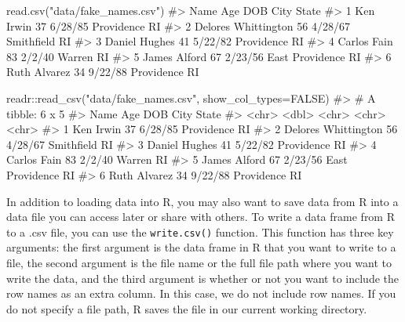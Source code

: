 \documentclass[
  letterpaper,
]{latex/krantz}
\makeatletter
\newenvironment{Shaded}{\begin{snugshade}}{\end{snugshade}}
\newcommand{\AttributeTok}[1]{\textcolor[rgb]{0.40,0.45,0.13}{#1}}
\newcommand{\CommentTok}[1]{\textcolor[rgb]{0.37,0.37,0.37}{#1}}
\newcommand{\ConstantTok}[1]{\textcolor[rgb]{0.56,0.35,0.01}{#1}}
\newcommand{\FunctionTok}[1]{\textcolor[rgb]{0.28,0.35,0.67}{#1}}
\newcommand{\NormalTok}[1]{\textcolor[rgb]{0.00,0.23,0.31}{#1}}
\newcommand{\SpecialCharTok}[1]{\textcolor[rgb]{0.37,0.37,0.37}{#1}}
\newcommand{\StringTok}[1]{\textcolor[rgb]{0.13,0.47,0.30}{#1}}
\newenvironment{kframe}{%
\medskip{}
\setlength{\fboxsep}{.8em}
 \def\at@end@of@kframe{}%
 \ifinner\ifhmode%
  \def\at@end@of@kframe{\end{minipage}}%
  \begin{minipage}{\columnwidth}%
 \fi\fi%
 \def\FrameCommand##1{\hskip\@totalleftmargin \hskip-\fboxsep
 \colorbox{shadecolor}{##1}\hskip-\fboxsep
     \hskip-\linewidth \hskip-\@totalleftmargin \hskip\columnwidth}%
 \MakeFramed {\advance\hsize-\width
   \@totalleftmargin\z@ \linewidth\hsize
   \@setminipage}}%
 {\par\unskip\endMakeFramed%
 \at@end@of@kframe}
\renewenvironment{Shaded}{\begin{kframe}}{\end{kframe}}
\makeatother
\begin{document}
\begin{Shaded}
\begin{Highlighting}[]
\FunctionTok{read.csv}\NormalTok{(}\StringTok{"data/fake\_names.csv"}\NormalTok{)}
\CommentTok{\#\textgreater{}                  Name Age     DOB            City State}
\CommentTok{\#\textgreater{} 1           Ken Irwin  37 6/28/85      Providence    RI}
\CommentTok{\#\textgreater{} 2 Delores Whittington  56 4/28/67      Smithfield    RI}
\CommentTok{\#\textgreater{} 3       Daniel Hughes  41 5/22/82      Providence    RI}
\CommentTok{\#\textgreater{} 4         Carlos Fain  83  2/2/40          Warren    RI}
\CommentTok{\#\textgreater{} 5        James Alford  67 2/23/56 East Providence    RI}
\CommentTok{\#\textgreater{} 6        Ruth Alvarez  34 9/22/88      Providence    RI}
\end{Highlighting}
\end{Shaded}

\begin{Shaded}
\begin{Highlighting}[]
\NormalTok{readr}\SpecialCharTok{::}\FunctionTok{read\_csv}\NormalTok{(}\StringTok{"data/fake\_names.csv"}\NormalTok{, }\AttributeTok{show\_col\_types=}\ConstantTok{FALSE}\NormalTok{)}
\CommentTok{\#\textgreater{} \# A tibble: 6 x 5}
\CommentTok{\#\textgreater{}   Name                  Age DOB     City            State}
\CommentTok{\#\textgreater{}   \textless{}chr\textgreater{}               \textless{}dbl\textgreater{} \textless{}chr\textgreater{}   \textless{}chr\textgreater{}           \textless{}chr\textgreater{}}
\CommentTok{\#\textgreater{} 1 Ken Irwin              37 6/28/85 Providence      RI   }
\CommentTok{\#\textgreater{} 2 Delores Whittington    56 4/28/67 Smithfield      RI   }
\CommentTok{\#\textgreater{} 3 Daniel Hughes          41 5/22/82 Providence      RI   }
\CommentTok{\#\textgreater{} 4 Carlos Fain            83 2/2/40  Warren          RI   }
\CommentTok{\#\textgreater{} 5 James Alford           67 2/23/56 East Providence RI   }
\CommentTok{\#\textgreater{} 6 Ruth Alvarez           34 9/22/88 Providence      RI}
\end{Highlighting}
\end{Shaded}

In addition to loading data into R, you may also want to save data from
R into a data file you can access later or share with others. To write a
data frame  from R to a .csv file, you can use the
\texttt{write.csv()}
 function. This
function has three key arguments: the first argument is the data frame
in R that you want to write to a file, the second argument is the file
name or the full file path where you want to write the data, and the
third argument is whether or not you want to include the row names as an
extra column. In this case, we do not include row names. If you do not
specify a file path, R saves the file in our current working directory.
\end{document}
